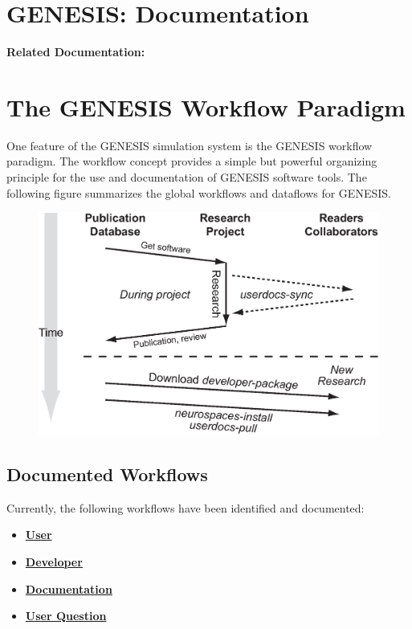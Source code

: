 \documentclass[12pt]{article}
\begin{document}
\section*{GENESIS: Documentation}

{\bf Related Documentation:}

\section*{The GENESIS Workflow Paradigm}

One feature of the GENESIS simulation system is the GENESIS workflow paradigm. The workflow concept provides a simple but powerful organizing principle for the use and documentation of GENESIS software tools. The following figure summarizes the global workflows and dataflows for GENESIS.

\begin{figure}[h]
  \centering
   \includegraphics[scale=0.6]{figures/global-workdata-flow.eps}
  \label{fig:wf-1}
\end{figure}

\subsection*{Documented Workflows}
Currently, the following workflows have been identified and documented:
\begin{itemize}
\item \href{../workflow-user/workflow-user.tex}{\bf User}
\item \href{../workflow-developer/workflow-developer.tex}{\bf Developer}
\item \href{../workflow-documentation/workflow-documentation.tex}{\bf Documentation}
\item \href{../workflow-user-query/workflow-user-query.tex}{\bf User Question}
\end{itemize}
\end{document}
